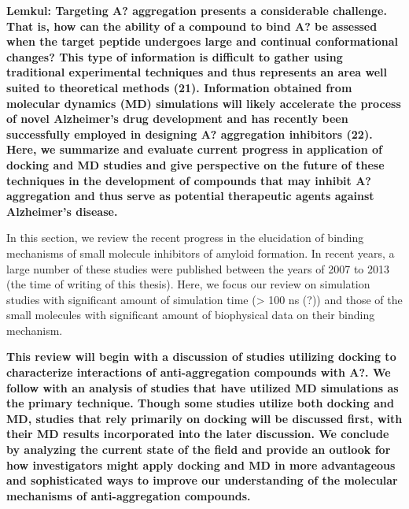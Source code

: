 \textbf{Lemkul: Targeting A? aggregation presents a considerable challenge. That is, how can the ability of a compound to bind A? be assessed when the target peptide undergoes large and continual conformational changes? This type of information is difficult to gather using traditional experimental techniques and thus represents an area well suited to theoretical methods (21). Information obtained from molecular dynamics (MD) simulations will likely accelerate the process of novel Alzheimer’s drug development and has recently been successfully employed in designing A? aggregation inhibitors (22). Here, we summarize and evaluate current progress in application of docking and MD studies and give perspective on the future of these techniques in the development of compounds that may inhibit A? aggregation and thus serve as potential therapeutic agents against Alzheimer’s disease.}

In this section, we review the recent progress in the elucidation of binding mechanisms of small molecule inhibitors of amyloid formation. In recent years, a large number of these studies were published between the years of 2007 to 2013 (the time of writing of this thesis). Here, we focus our review on simulation studies with significant amount of simulation time (> 100 ns (?)) and those of the small molecules with significant amount of biophysical data on their binding mechanism.

\textbf{This review will begin with a discussion of studies utilizing docking to characterize interactions of anti-aggregation compounds with A?. We follow with an analysis of studies that have utilized MD simulations as the primary technique. Though some studies utilize both docking and MD, studies that rely primarily on docking will be discussed first, with their MD results incorporated into the later discussion.  We conclude by analyzing the current state of the field and provide an outlook for how investigators might apply docking and MD in more advantageous and sophisticated ways to improve our understanding of the molecular mechanisms of anti-aggregation compounds.}

